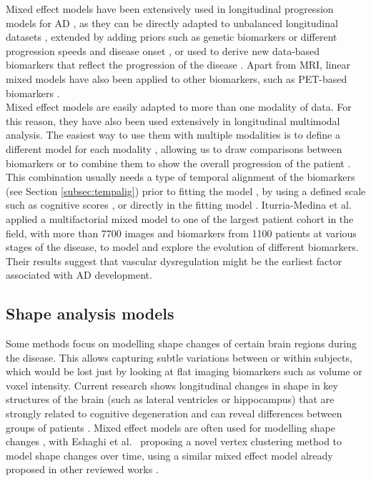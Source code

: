 Mixed effect models have been extensively used in longitudinal progression models for AD \cite{Bilgel2015a,Bilgel2016,Davatzikos2009,Koval2018,miriad,Platero2019,Schiratti2015,Villemagne2013,Ziegler2015b}, as they can be directly adapted to unbalanced longitudinal datasets \cite{Koval2018}, extended by adding priors such as genetic biomarkers \cite{Ziegler2015b} or different progression speeds and disease onset \cite{Schiratti2015}, or used to derive new data-based biomarkers that reflect the progression of the disease \cite{Bilgel2015a,Bilgel2016,Davatzikos2009,Platero2019}. Apart from MRI, linear mixed models have also been applied to other biomarkers, such as PET-based biomarkers \cite{Bilgel2016,Dodge2014}. \\

Mixed effect models are easily adapted to more than one modality of data. For this reason, they have also been used extensively in longitudinal multimodal analysis. The easiest way to use them with multiple modalities is to define a different model for each modality \cite{Dodge2014,Guerrero2016,Li2017c}, allowing us to draw comparisons between biomarkers \cite{Jedynak2012} or to combine them to show the overall progression of the patient \cite{Bilgel2015a,Bilgel2016,Donohue14,Jedynak2012,Li2017a}. This combination usually needs a type of temporal alignment of the biomarkers (see Section \ref{subsec:tempalig}) prior to fitting the model \cite{Guerrero2016}, by using a defined scale such as cognitive scores \cite{Yang2011}, or directly in the fitting model \cite{Li2017a}. Iturria-Medina et al.\ \cite{Iturria-Medina2016} applied a multifactorial mixed model to one of the largest patient cohort in the field, with more than 7700 images and biomarkers from 1100 patients at various stages of the disease, to model and explore the evolution of different biomarkers. Their results suggest that vascular dysregulation might be the earliest factor associated with AD development. 

\subsection{Shape analysis models}

Some methods focus on modelling shape changes of certain brain regions during the disease. This allows capturing subtle variations between or within subjects, which would be lost just by looking at flat imaging biomarkers such as volume or voxel intensity. Current research shows longitudinal changes in shape in key structures of the brain (such as lateral ventricles or hippocampus) that are strongly related to cognitive degeneration \cite{Gui2017,Tang2015} and can reveal differences between groups of patients \cite{Bone2017,Bone2018,Gutman2013}. Mixed effect models are often used for modelling shape changes \cite{Bone2017,Bone2018,Gui2017,Tang2015}, with Eshaghi et al.\ \cite{Eshaghi2017} proposing a novel vertex clustering method to model shape changes over time, using a similar mixed effect model already proposed in other reviewed works \cite{Donohue14,Jedynak2012,Schiratti2015}.

